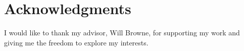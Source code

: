 \chapter*{Acknowledgments}\label{C:ack}

I would like to thank my advisor, Will Browne, for supporting my work and giving me the freedom to explore my interests.
